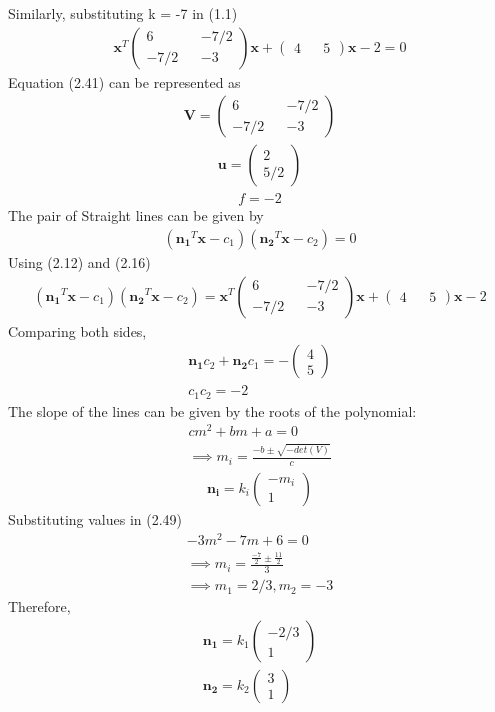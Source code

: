 \documentclass[journal,13pt,twocolumn]{IEEEtran}
\newcommand{\myvec}[1]{\ensuremath{\begin{pmatrix}#1\end{pmatrix}}}
\renewcommand{\vec}[1]{\mathbf{#1}}
\begin{document}
   Similarly, substituting k = -7 in (1.1)
   \begin{align}
   \vec{x}^T \myvec{6 && -7/2 \\ -7/2 && -3} \vec{x} + \myvec{4 && 5}\vec{x} -2 = 0
   \end{align}
   Equation (2.41) can be represented as 
\begin{align}
\vec{V}=\myvec{6 && -7/2\\ -7/2 && -3}
\end{align}
\begin{align}
\vec{u}=\myvec{2\\5/2}
\end{align}
\begin{align}
f= -2
\end{align}
The pair of Straight lines can be given by
\begin{align}
(\vec{n_1}^T\vec{x}-c_1)(\vec{n_2}^T\vec{x}-c_2)=0
\end{align}
Using (2.12) and (2.16)
\begin{align}
(\vec{n_1}^T\vec{x}-c_1)(\vec{n_2}^T\vec{x}-c_2)= \vec{x}^T \myvec{6 && -7/2 \\ -7/2 && -3} \vec{x} + \myvec{4 && 5}\vec{x} -2
\end{align}
Comparing both sides,
\begin{align}
\vec{n_1}c_2 + \vec{n_2}c_1 = -\myvec{4 \\ 5}\\
c_1c_2 = -2
\end{align}
The slope of the lines can be given by the roots of the polynomial:
\begin{align}
cm^2 + bm + a = 0\\
\implies m_i=\frac{-b\pm\sqrt{-det(V)}}{c}
\end{align}
\begin{align}
\vec{n_i} = k_i\myvec{-m_i \\ 1}
\end{align}
Substituting values in (2.49)
\begin{align}
-3m^2 -7m +6 = 0\\
\implies m_i = \frac{\frac{-7}{2}\pm \frac{11}{2}}{3}\\
\implies m_1 = 2/3 , m_2 = -3
\end{align}
Therefore,
\begin{align}
\vec{n_1} = k_1 \myvec{-2/3 \\ 1}\\
\vec{n_2} = k_2 \myvec{3 \\ 1}
\end{align}
\end{document}
